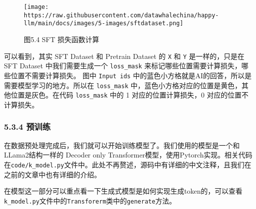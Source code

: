 \documentclass[12pt,a4paper]{book}
\begin{document}
\begin{figure}[htbp]\centering
\texttt{[image: https://raw.githubusercontent.com/datawhalechina/happy-llm/main/docs/images/5-images/sftdataset.png]}
\caption{图5.4 SFT 损失函数计算}
\end{figure}

可以看到，其实 SFT Dataset 和 Pretrain Dataset 的 \texttt{X} 和
\texttt{Y} 是一样的，只是在 SFT Dataset 中我们需要生成一个
\texttt{loss\_mask} 来标记哪些位置需要计算损失，哪些位置不需要计算损失。
图中 \texttt{Input\ ids}
中的蓝色小方格就是AI的回答，所以是需要模型学习的地方。所以在
\texttt{loss\_mask}
中，蓝色小方格对应的位置是黄色，其他位置是灰色。在代码
\texttt{loss\_mask} 中的 1 对应的位置计算损失，0 对应的位置不计算损失。

\subsubsection{5.3.4 预训练}\label{ux9884ux8badux7ec3}

在数据预处理完成后，我们就可以开始训练模型了。我们使用的模型是一个和LLama2结构一样的
Decoder only
Transformer模型，使用Pytorch实现。相关代码在\texttt{code/k\_model.py}文件中。此处不再赘述，源码中有详细的中文注释，且我们在之前的文章中也有详细的介绍。

在模型这一部分可以重点看一下生成式模型是如何实现生成token的，可以查看\texttt{k\_model.py}文件中的\texttt{Transforerm}类中的\texttt{generate}方法。
\end{document}
